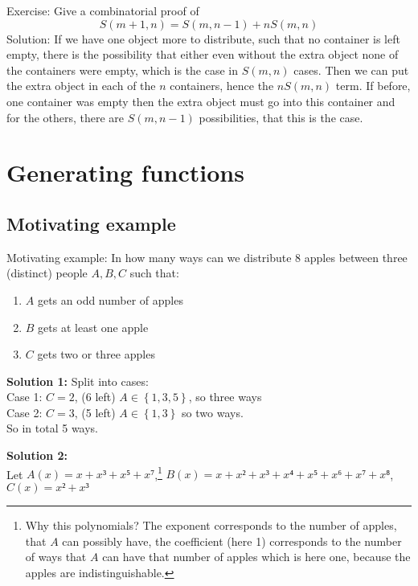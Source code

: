 \documentclass[english]{lbscript}
\begin{document}
\begin{example}{}{}
  Exercise: Give a  combinatorial proof of
  \begin{equation}
    \label{eq:18}
    S(m+1,n) = S(m, n-1) + n S(m,n)
  \end{equation}
Solution: If we have one object more to distribute, such that no container is left empty, there is the possibility that either even without the extra object none of the containers were empty, which is the case in \(S(m, n)\) cases. Then we can put the extra object in each of the \(n\) containers, hence the \(nS(m, n)\) term. If before, one container was empty then the extra object must go into this container and for the others, there are \(S(m, n-1)\) possibilities, that this is the case.
\end{example}


\section{Generating functions}
\label{sec:generating-functions}

\subsection{Motivating example}
\label{sec:motivating-example}

Motivating example: In how many ways can we distribute 8 apples between three (distinct) people \(A, B, C\) such that:
\begin{enumerate}
  \item\label{item:4} \(A\) gets an odd number of apples
  \item\label{item:5} \(B\) gets at least one apple
  \item\label{item:6} \(C\) gets two or three apples
\end{enumerate}

\textbf{Solution 1:} Split into cases:\\
Case 1: \(C=2\), (6 left) \(A∈\left\{ 1,3,5 \right\} \), so three ways\\
Case 2: \(C=3\), (5 left) \(A∈\left\{ 1, 3 \right\}\) so two ways.\\
So in total 5 ways.

\textbf{Solution 2:}\\
Let \(A(x)=x+x³+x⁵+x⁷\),\footnote{Why this polynomials? The exponent corresponds to the number of apples, that \(A\) can possibly have, the coefficient (here 1) corresponds to the number of ways that \(A\) can have that number of apples which is here one, because the apples are indistinguishable.} \(B(x)= x + x²+x³+x⁴+x⁵+x⁶+x⁷+x⁸\), \(C(x)=x²+x³\)
\end{document}
